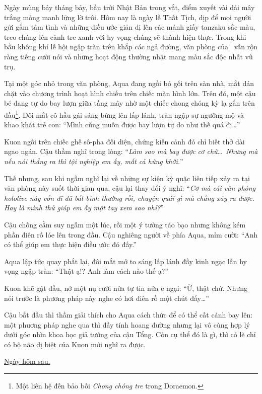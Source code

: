 \documentclass[../main.tex]{subfiles}
\begin{document}
Ngày mùng bảy tháng bảy, bầu trời Nhật Bản trong vắt, điểm xuyết vài dải mây trắng mỏng manh lững lờ trôi. Hôm nay là ngày lễ Thất Tịch, dịp để mọi người gửi gắm tâm tình và những điều ước giản dị lên các mảnh giấy tanzaku sắc màu, treo chúng lên cành tre xanh với hy vọng chúng sẽ thành hiện thực. Trong khi bầu không khí lễ hội ngập tràn trên khắp các ngả đường, văn phòng của \hll\ vẫn rộn ràng tiếng cười nói và những hoạt động thường nhật mang màu sắc độc nhất vũ trụ.


Tại một góc nhỏ trong văn phòng, Aqua đang ngồi bó gối trên sàn nhà, mắt dán chặt vào chương trình hoạt hình chiếu trên chiếc màn hình lớn. Trên đó, một cậu bé đang tự do bay lượn giữa tầng mây nhờ một chiếc chong chóng kỳ lạ gắn trên đầu\footnote{Một liên hệ đến bảo bối \textit{Chong chóng tre} trong Doraemon.}. Đôi mắt cô hầu gái sáng bừng lên lấp lánh, tràn ngập sự ngưỡng mộ và khao khát trẻ con: ``Mình cũng muốn được bay lượn tự do như thế quá đi\dots''

Kuon ngồi trên chiếc ghế sô-pha đối diện, chứng kiến cảnh đó chỉ biết thở dài ngao ngán. Cậu thầm nghĩ trong lòng: ``\textit{Làm sao mà bay được cơ chứ\dots\ Nhưng mà nếu nói thẳng ra thì tội nghiệp em ấy, mất cả hứng khởi.}''

Thế nhưng, sau khi ngẫm nghĩ lại về những sự kiện kỳ quặc liên tiếp xảy ra tại văn phòng này suốt thời gian qua, cậu lại thay đổi ý nghĩ: ``\textit{Cơ mà cái văn phòng hololive này vốn dĩ đã bất bình thường rồi, chuyện quái gì mà chẳng xảy ra được. Hay là mình thử giúp em ấy một tay xem sao nhỉ?}''

Cậu chống cằm suy ngẫm một lúc, rồi một ý tưởng táo bạo nhưng không kém phần điên rồ lóe lên trong đầu. Cậu nghiêng người về phía Aqua, mỉm cười: ``Anh có thể giúp em thực hiện điều ước đó đấy.''

Aqua lập tức quay phắt lại, đôi mắt mở to sáng lấp lánh đầy kinh ngạc lẫn hy vọng ngập tràn: ``Thật ạ!? Anh làm cách nào thế ạ?''

Kuon khẽ gật đầu, nở một nụ cười nửa tự tin nửa e ngại: ``Ừ, thật chứ. Nhưng nói trước là phương pháp này nghe có hơi điên rồ một chút đấy\dots''

Cậu bắt đầu thì thầm giải thích cho Aqua cách thức để có thể cất cánh bay lên: một phương pháp nghe qua thì đầy tính hoang đường nhưng lại vô cùng hợp lý dưới góc nhìn khoa học giả tưởng của cậu Tổng. Còn cụ thể đó là gì, thì có lẽ chỉ có bộ não dị biệt của Kuon mới nghĩ ra được.

\begin{center}
  \uline{Ngày hôm sau.}
\end{center}
\end{document}
